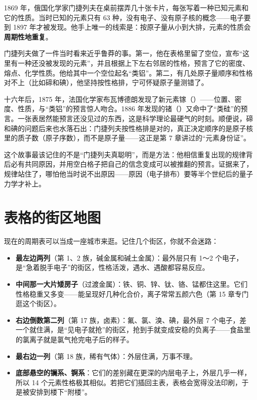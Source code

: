 \begin{zhengju}
1869 年，俄国化学家门捷列夫在桌前摆弄几十张卡片，每张写着一种已知元素和它的性质。当时已知的元素只有 63 种，没有电子、没有原子核的概念——电子要到 1897 年才被发现。他手上唯一的线索是：按原子量从小到大排，元素的性质会\textbf{周期性地重复}。

门捷列夫做了一件当时看来近乎鲁莽的事。第一，他在表格里留了空位，宣布“这里有一种还没被发现的元素”，并且根据上下左右邻居的性格，预言了它的密度、熔点、化学性质。他给其中一个空位起名“类铝”。第二，有几处原子量顺序和性格对不上（比如碲和碘），他坚持按性格排，宁可怀疑原子量测错了。

十六年后，1875 年，法国化学家布瓦博德朗发现了新元素镓（）——位置、密度、性质，与“类铝”的预言惊人吻合。1886 年发现的锗（）又命中了“类硅”的预言。一张表居然能预言还没见过的东西，这是科学理论最硬气的时刻。顺便说，碲和碘的问题后来也水落石出：门捷列夫按性格排是对的，真正决定顺序的是原子核里的质子数（原子序数），而不是原子量——这正是第 7 章讲过的“元素身份证”。

这个故事最该记住的不是“门捷列夫真聪明”，而是方法：他相信重复出现的规律背后必有共同原因，并用空白格子把自己的信念变成可以被推翻的预言。证据来了，规律站住了，哪怕他当时说不出原因——原因（电子排布）要等半个世纪后的量子力学才补上。
\end{zhengju}

\section{表格的街区地图}

现在的周期表可以当成一座城市来逛。记住几个街区，你就不会迷路：

\begin{itemize}[itemsep=2pt]
\item \textbf{最左边两列}（第 1、2 族，碱金属和碱土金属）：最外层只有 1～2 个电子，是“急着脱手电子”的街区，性格活泼，遇水、遇酸都容易反应。
\item \textbf{中间那一大片矮房子}（过渡金属）：铁、铜、锌、钛、铬、锰都住这里。它们性格稳重又多变——能呈现好几种化合价，离子常常五颜六色（第 15 章专门逛这个街区）。
\item \textbf{右边倒数第二列}（第 17 族，卤素）：氟、氯、溴、碘，最外层 7 个电子，差一个就住满，是“见电子就抢”的街区，抢到手就变成安稳的负离子——食盐里的氯离子就是氯气抢完电子后的样子。
\item \textbf{最右边一列}（第 18 族，稀有气体）：外层住满，万事不理。
\item \textbf{底部悬空的镧系、锕系}：它们的差别藏在更深的内层电子上，外层几乎一样，所以 14 个元素性格极其相似。若把它们插回主表，表格会宽得没法印刷，于是被安排到楼下“附楼”。
\end{itemize}

